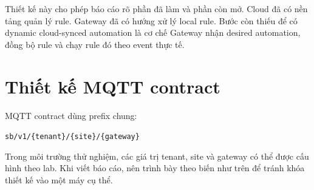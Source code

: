 Thiết kế này cho phép báo cáo rõ phần đã làm và phần còn mở. Cloud đã có nền tảng quản lý rule. Gateway đã có hướng xử lý local rule. Bước còn thiếu để có dynamic cloud-synced automation là cơ chế Gateway nhận desired automation, đồng bộ rule và chạy rule đó theo event thực tế.

\newpage
\section{Thiết kế MQTT contract}
\label{sec:ch3-contract}

MQTT contract dùng prefix chung:

\begin{center}
\texttt{sb/v1/\{tenant\}/\{site\}/\{gateway\}}
\end{center}

Trong môi trường thử nghiệm, các giá trị tenant, site và gateway có thể được cấu hình theo lab. Khi viết báo cáo, nên trình bày theo biến như trên để tránh khóa thiết kế vào một máy cụ thể.

